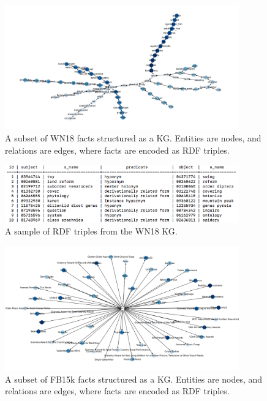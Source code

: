 \begin{figure}
   	\centering
    	\includegraphics[width=0.9\textwidth, height=0.6\textwidth]{WN18_Graph}
	\captionsetup{justification=centering}
	\caption{A subset of WN18 facts structured as a KG. Entities are nodes, and relations are edges, where facts are encoded as RDF triples.}
\end{figure}

\begin{figure}
   	\centering
    	\includegraphics[width=0.9\textwidth, height=0.3\textwidth]{wn18_fact_sample}
	\captionsetup{justification=centering}
	\caption{A sample of RDF triples from the WN18 KG.}
\end{figure}

\begin{figure}
   	\centering
    	\includegraphics[width=0.9\textwidth, height=0.6\textwidth]{FB15k_Graph}
	\captionsetup{justification=centering}
	\caption{A subset of FB15k facts structured as a KG. Entities are nodes, and relations are edges, where facts are encoded as RDF triples.}
\end{figure}

